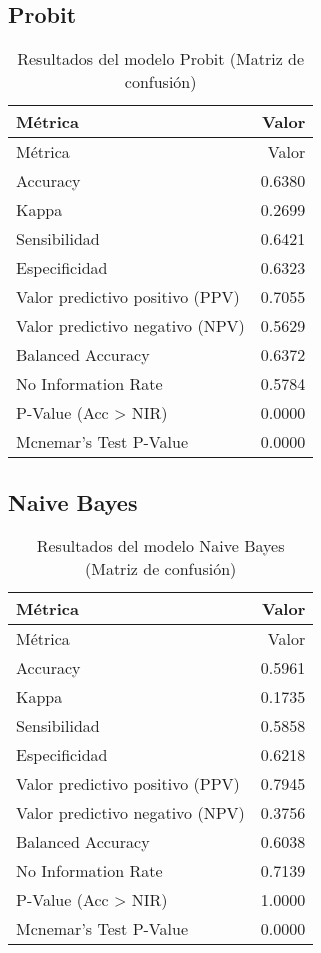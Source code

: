 \documentclass[Royal,times,sageh]{sagej}
\begin{document}
\subsection{Probit}\label{probit}

\begin{longtable}[]{@{}lr@{}}
\caption{Resultados del modelo Probit (Matriz de
confusión)}\tabularnewline
\toprule\noalign{}
Métrica & Valor \\
\midrule\noalign{}
\endfirsthead
\toprule\noalign{}
Métrica & Valor \\
\midrule\noalign{}
\endhead
\bottomrule\noalign{}
\endlastfoot
Accuracy & 0.6380 \\
Kappa & 0.2699 \\
Sensibilidad & 0.6421 \\
Especificidad & 0.6323 \\
Valor predictivo positivo (PPV) & 0.7055 \\
Valor predictivo negativo (NPV) & 0.5629 \\
Balanced Accuracy & 0.6372 \\
No Information Rate & 0.5784 \\
P-Value (Acc \textgreater{} NIR) & 0.0000 \\
Mcnemar's Test P-Value & 0.0000 \\
\end{longtable}

\subsection{Naive Bayes}\label{naive-bayes-1}

\begin{longtable}[]{@{}lr@{}}
\caption{Resultados del modelo Naive Bayes (Matriz de
confusión)}\tabularnewline
\toprule\noalign{}
Métrica & Valor \\
\midrule\noalign{}
\endfirsthead
\toprule\noalign{}
Métrica & Valor \\
\midrule\noalign{}
\endhead
\bottomrule\noalign{}
\endlastfoot
Accuracy & 0.5961 \\
Kappa & 0.1735 \\
Sensibilidad & 0.5858 \\
Especificidad & 0.6218 \\
Valor predictivo positivo (PPV) & 0.7945 \\
Valor predictivo negativo (NPV) & 0.3756 \\
Balanced Accuracy & 0.6038 \\
No Information Rate & 0.7139 \\
P-Value (Acc \textgreater{} NIR) & 1.0000 \\
Mcnemar's Test P-Value & 0.0000 \\
\end{longtable}
\end{document}
